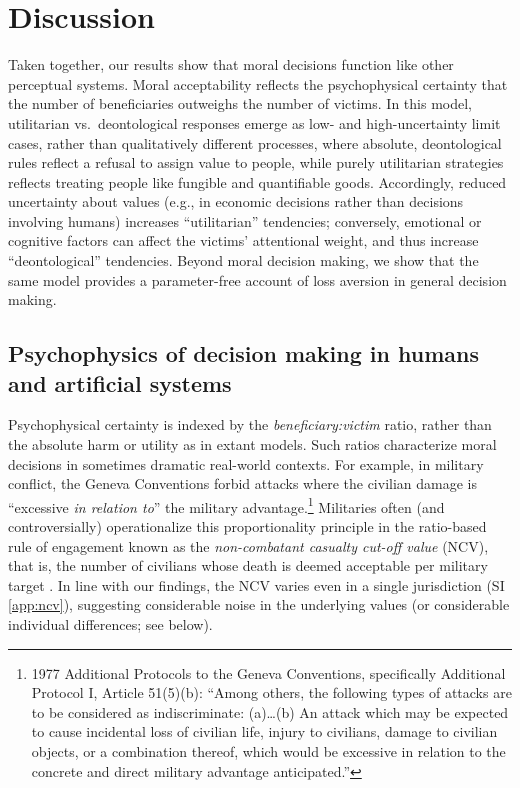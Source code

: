 \documentclass[
]{article}
\begin{document}
\clearpage

\section{Discussion}\label{discussion}

Taken together, our results show that moral decisions function like other perceptual systems. Moral acceptability reflects the psychophysical certainty that the number of beneficiaries outweighs the number of victims. In this model, utilitarian vs.~deontological responses emerge as low- and high-uncertainty limit cases, rather than qualitatively different processes, where absolute, deontological rules reflect a refusal to assign value to people, while purely utilitarian strategies reflects treating people like fungible and quantifiable goods. Accordingly, reduced uncertainty about values (e.g., in economic decisions rather than decisions involving humans) increases ``utilitarian'' tendencies; conversely, emotional or cognitive factors can affect the victims' attentional weight, and thus increase ``deontological'' tendencies. Beyond moral decision making, we show that the same model provides a parameter-free account of loss aversion in general decision making.

\subsection{Psychophysics of decision making in humans and artificial systems}\label{psychophysics-of-decision-making-in-humans-and-artificial-systems}

Psychophysical certainty is indexed by the \emph{beneficiary:victim} ratio, rather than the absolute harm or utility as in extant models. Such ratios characterize moral decisions in sometimes dramatic real-world contexts. For example, in military conflict, the Geneva Conventions forbid attacks where the civilian damage is ``excessive \emph{in relation to}'' the military advantage.\footnote{1977 Additional Protocols to the Geneva Conventions, specifically Additional Protocol I, Article 51(5)(b): ``Among others, the following types of attacks are to be considered as indiscriminate: (a)\ldots(b) An attack which may be expected to cause incidental loss of civilian life, injury to civilians, damage to civilian objects, or a combination thereof, which would be excessive in relation to the concrete and direct military advantage anticipated.''} Militaries often (and controversially) operationalize this proportionality principle in the ratio-based rule of engagement known as the \emph{non-combatant casualty cut-off value} (NCV), that is, the number of civilians whose death is deemed acceptable per military target \autocite{Jones2020}. In line with our findings, the NCV varies even in a single jurisdiction (SI \ref{app:ncv}), suggesting considerable noise in the underlying values (or considerable individual differences; see below).
\end{document}
